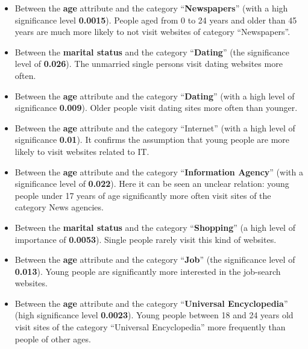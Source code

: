 \documentclass[runningheads,a4paper]{llncs}
\begin{document}
\begin{itemize}
	\item Between the \textbf{age} attribute and the category ``\textbf{Newspapers}'' (with a high significance level \textbf{0.0015}). People aged from 0 to 24 years and older than 45 years are much more likely to not visit websites of category ``Newspapers''.

	\item Between the \textbf{marital status} and the category ``\textbf{Dating}'' (the significance level of \textbf{0.026}). The unmarried single persons visit dating websites more often.
	
	\item Between the \textbf{age} attribute and the category ``\textbf{Dating}'' (with a high level of significance \textbf{0.009}). Older people visit dating sites more often than younger.
	
	\item Between the \textbf{age} attribute and the category ``Internet'' (with a high level of significance \textbf{0.01}). It confirms the assumption that young people are more likely to visit websites related to IT.
	
	\item Between the \textbf{age} attribute and the category ``\textbf{Information Agency}'' (with a significance level of \textbf{0.022}). Here it can be seen an unclear relation: young people under 17 years of age significantly more often visit sites of the category News agencies.
	
	\item Between the \textbf{marital status} and the category ``\textbf{Shopping}'' (a high level of importance of \textbf{0.0053}). Single people rarely visit this kind of websites.
	
	\item Between the \textbf{age} attribute and the category ``\textbf{Job}'' (the significance level of \textbf{0.013}). Young people are significantly more interested in the job-search websites.
	
	\item Between the \textbf{age} attribute and the category ``\textbf{Universal Encyclopedia}'' (high significance level \textbf{0.0023}). 
	Young people between 18 and 24 years old visit sites of the category ``Universal Encyclopedia'' more frequently than people of other ages.
	

\end{itemize}
\end{document}
